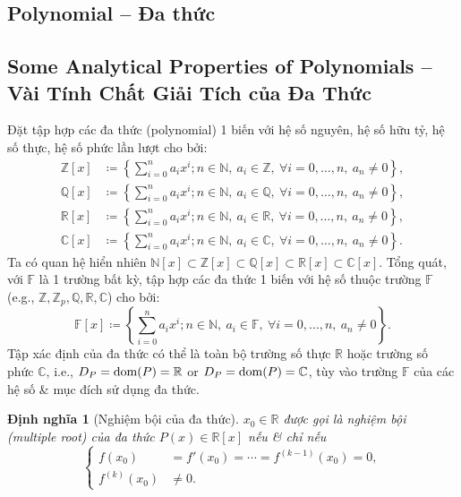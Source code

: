 \documentclass{article}
\newtheorem{dinhnghia}{Định nghĩa}
\begin{document}

\subsection{Polynomial -- Đa thức}

\subsection{Some Analytical Properties of Polynomials -- Vài Tính Chất Giải Tích của Đa Thức}
Đặt tập hợp các đa thức (polynomial) 1 biến với hệ số nguyên, hệ số hữu tỷ, hệ số thực, hệ số phức lần lượt cho bởi:
\begin{align*}
	\mathbb{Z}[x]&\coloneqq\left\{\sum_{i=0}^n a_ix^i;n\in\mathbb{N},\ a_i\in\mathbb{Z},\ \forall i = 0,\ldots,n,\ a_n\ne0\right\},\\
	\mathbb{Q}[x]&\coloneqq\left\{\sum_{i=0}^n a_ix^i;n\in\mathbb{N},\ a_i\in\mathbb{Q},\ \forall i = 0,\ldots,n,\ a_n\ne0\right\},\\
	\mathbb{R}[x]&\coloneqq\left\{\sum_{i=0}^n a_ix^i;n\in\mathbb{N},\ a_i\in\mathbb{R},\ \forall i = 0,\ldots,n,\ a_n\ne0\right\},\\
	\mathbb{C}[x]&\coloneqq\left\{\sum_{i=0}^n a_ix^i;n\in\mathbb{N},\ a_i\in\mathbb{C},\ \forall i = 0,\ldots,n,\ a_n\ne0\right\}.
\end{align*}
Ta có quan hệ hiển nhiên $\mathbb{N}[x]\subset\mathbb{Z}[x]\subset\mathbb{Q}[x]\subset\mathbb{R}[x]\subset\mathbb{C}[x]$. Tổng quát, với $\mathbb{F}$ là 1 trường bất kỳ, tập hợp các đa thức 1 biến với hệ số thuộc trường $\mathbb{F}$ (e.g., $\mathbb{Z},\mathbb{Z}_p,\mathbb{Q},\mathbb{R},\mathbb{C}$) cho bởi:
\begin{equation*}
	\mathbb{F}[x]\coloneqq\left\{\sum_{i=0}^n a_ix^i;n\in\mathbb{N},\ a_i\in\mathbb{F},\ \forall i = 0,\ldots,n,\ a_n\ne0\right\}.
\end{equation*}
Tập xác định của đa thức có thể là toàn bộ trường số thực $\mathbb{R}$ hoặc trường số phức $\mathbb{C}$, i.e., $D_P = {\rm dom}(P) = \mathbb{R}$ or $D_P = {\rm dom}(P) = \mathbb{C}$, tùy vào trường $\mathbb{F}$ của các hệ số \& mục đích sử dụng đa thức.

\begin{dinhnghia}[Nghiệm bội của đa thức]
	$x_0\in\mathbb{R}$ được gọi là {\rm nghiệm bội} (multiple root) của đa thức $P(x)\in\mathbb{R}[x]$ nếu \& chỉ nếu
	\begin{equation*}
		\left\{\begin{split}
			f(x_0) &= f'(x_0) = \cdots = f^{(k - 1)}(x_0) = 0,\\
			f^{(k)}(x_0)&\ne0.
		\end{split}\right.
	\end{equation*}
\end{dinhnghia}
\end{document}
